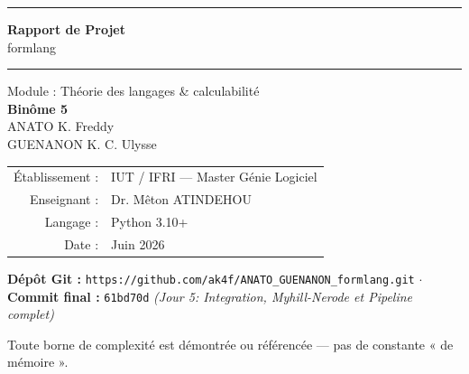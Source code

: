 \documentclass[12pt,a4paper,oneside]{scrartcl}
\begin{document}
\begin{titlepage}
\centering
\vspace*{2cm}

{\color{bordure}\rule{\textwidth}{0.5pt}}
\vspace{0.6cm}

{\Huge\bfseries\color{noir} Rapport de Projet}\\[0.4cm]
{\LARGE\color{gris} formlang}\\[0.6cm]

{\color{bordure}\rule{\textwidth}{0.5pt}}
\vspace{1.5cm}

{\Large\color{gris} Module : Théorie des langages \& calculabilité}\\[1cm]

{\large\color{noir}\bfseries Binôme 5}\\[0.4cm]
{\large\color{gris} ANATO K. Freddy}\\[0.2cm]
{\large\color{gris} GUENANON K. C. Ulysse}\\[2cm]

\begin{tabular}{rl}
    \textcolor{grisclair}{Établissement :} & IUT / IFRI — Master Génie Logiciel \\
    \textcolor{grisclair}{Enseignant :} & Dr. Mêton ATINDEHOU \\
    \textcolor{grisclair}{Langage :} & Python 3.10+ \\
    \textcolor{grisclair}{Date :} & Juin 2026 \\
\end{tabular}

\vspace{0.8cm}
{\normalsize\color{gris}\textbf{Dépôt Git :} \texttt{https://github.com/ak4f/ANATO\_GUENANON\_formlang.git} \quad$\cdot$\quad \textbf{Commit final :} \texttt{61bd70d} \textit{(Jour 5: Integration, Myhill-Nerode et Pipeline complet)}}

\vfill

{\small\color{grisclair} Toute borne de complexité est démontrée ou référencée — pas de constante « de mémoire ».}

\end{titlepage}

\tableofcontents
\newpage

\end{document}
